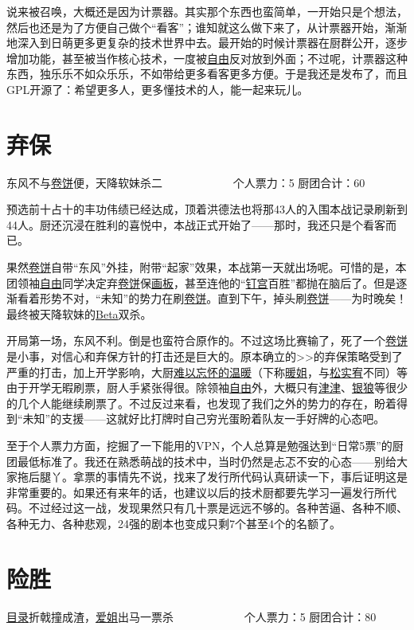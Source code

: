 说来被召唤，大概还是因为计票器。其实那个东西也蛮简单，一开始只是个想法，然后也还是为了方便自己做个“看客”；谁知就这么做下来了，从计票器开始，渐渐地深入到日萌更多更复杂的技术世界中去。最开始的时候计票器在厨群公开，逐步增加功能，甚至被当作核心技术，一度被\uline{自由}反对放到外面；不过呢，计票器这种东西，独乐乐不如众乐乐，不如带给更多看客更多方便。于是我还是发布了，而且GPL开源了：希望更多人，更多懂技术的人，能一起来玩儿。

\chapter{弃保}
\begin{center}
{\subTitle 东风不与\uline{卷饼}便，天降软妹杀二}
\subMemo
　　　　　　个人票力：5 厨团合计：60
\end{center}

预选前十占十的丰功伟绩已经达成，顶着洪德法也将那43人的入围本战记录刷新到44人。厨还沉浸在胜利的喜悦中，本战正式开始了——那时，我还只是个看客而已。

果然\uline{卷饼}自带“东风”外挂，附带“起家”效果，本战第一天就出场呢。可惜的是，本团领袖\uline{自由}同学决定弃\uline{卷饼}保\uline{画板}，甚至连他的“\uline{钉宫}百胜”都抛在脑后了。但是逐渐看着形势不对，“未知”的势力在刷\uline{卷饼}。直到下午，掉头刷\uline{卷饼}——为时晚矣！最终被天降软妹的\uline{Beta}双杀。

开局第一场，东风不利。倒是也蛮符合原作的。不过这场比赛输了，死了一个\uline{卷饼}是小事，对信心和弃保方针的打击还是巨大的。原本确立的>>的弃保策略受到了严重的打击，加上开学影响，大厨\uline{难以忘怀的温暖}（下称\uline{暖姐}，与\uline{松实宥}不同）等由于开学无暇刷票，厨人手紧张得很。除领袖\uline{自由}外，大概只有\uline{津津}、\uline{银狼}等很少的几个人能继续刷票了。不过反过来看，也发现了我们之外的势力的存在，盼着得到“未知”的支援——这就好比打牌时自己穷光蛋盼着队友一手好牌的心态吧。

至于个人票力方面，挖掘了一下能用的VPN，个人总算是勉强达到“日常5票”的厨团最低标准了。我还在熟悉萌战的技术中，当时仍然是忐忑不安的心态——别给大家拖后腿丫。拿票的事情先不说，找来了发行所代码认真研读一下，事后证明这是非常重要的。如果还有来年的话，也建议以后的技术厨都要先学习一遍发行所代码。不过经过这一战，发现果然只有几十票是远远不够的。各种苦逼、各种不顺、各种无力、各种悲观，24强的剧本也变成只剩7个甚至4个的名额了。


\chapter{险胜}
\begin{center}
{\subTitle \uline{目录}折戟撞成渣，\uline{爱姐}出马一票杀}
\subMemo
　　　　　　个人票力：5 厨团合计：80
\end{center}

